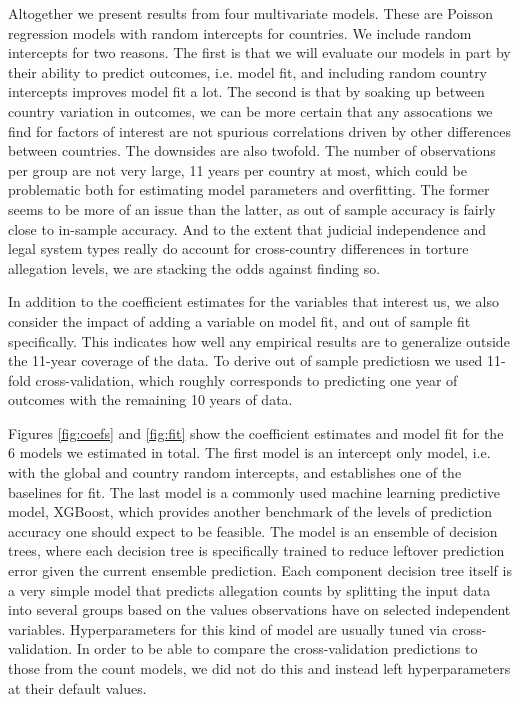 \documentclass[12pt]{article}
\begin{document}
Altogether we present results from four multivariate models. These are Poisson regression models with random intercepts for countries. We include random intercepts for two reasons. The first is that we will evaluate our models in part by their ability to predict outcomes, i.e. model fit, and including random country intercepts improves model fit a lot. The second is that by soaking up between country variation in outcomes, we can be more certain that any assocations we find for factors of interest are not spurious correlations driven by other differences between countries. The downsides are also twofold. The number of observations per group are not very large, 11 years per country at most, which could be problematic both for estimating model parameters and overfitting. The former seems to be more of an issue than the latter, as out of sample accuracy is fairly close to in-sample accuracy. And to the extent that judicial independence and legal system types really do account for cross-country differences in torture allegation levels, we are stacking the odds against finding so. 

In addition to the coefficient estimates for the variables that interest us, we also consider the impact of adding a variable on model fit, and out of sample fit specifically. This indicates how well any empirical results are to generalize outside the 11-year coverage of the data. To derive out of sample predictiosn we used 11-fold cross-validation, which roughly corresponds to predicting one year of outcomes with the remaining 10 years of data. 

Figures \ref{fig:coefs} and \ref{fig:fit} show the coefficient estimates and model fit for the 6 models we estimated in total. The first model is an intercept only model, i.e. with the global and country random intercepts, and establishes one of the baselines for fit. The last model is a commonly used machine learning predictive model, XGBoost, which provides another benchmark of the levels of prediction accuracy one should expect to be feasible. The model is an ensemble of decision trees, where each decision tree is specifically trained to reduce leftover prediction error given the current ensemble prediction. Each component decision tree itself is a very simple model that predicts allegation counts by splitting the input data into several groups based on the values observations have on selected independent variables. Hyperparameters for this kind of model are usually tuned via cross-validation. In order to be able to compare the cross-validation predictions to those from the count models, we did not do this and instead left hyperparameters at their default values.
\end{document}
